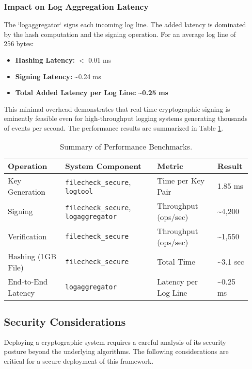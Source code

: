 \documentclass[12pt, letterpaper]{article}
\begin{document}
\subsubsection{Impact on Log Aggregation Latency}
The `logaggregator` signs each incoming log line. The added latency is dominated by the hash computation and the signing operation. For an average log line of 256 bytes:
\begin{itemize}
	\item \textbf{Hashing Latency:} $<$ 0.01 ms
	\item \textbf{Signing Latency:} \textasciitilde 0.24 ms
	\item \textbf{Total Added Latency per Log Line:} \textbf{\textasciitilde 0.25 ms}
\end{itemize}
This minimal overhead demonstrates that real-time cryptographic signing is eminently feasible even for high-throughput logging systems generating thousands of events per second. The performance results are summarized in Table \ref{tab:perf_summary}.

\begin{table}[h!]
	\centering
	\caption{Summary of Performance Benchmarks.}
	\label{tab:perf_summary}
	\begin{tabular}{|l|l|l|l|}
		\hline
		\textbf{Operation} & \textbf{System Component} & \textbf{Metric} & \textbf{Result} \\ \hline \hline
		Key Generation & \texttt{filecheck\_secure}, \texttt{logtool} & Time per Key Pair & 1.85 ms \\ \hline
		Signing & \texttt{filecheck\_secure}, \texttt{logaggregator} & Throughput (ops/sec) & \textasciitilde 4,200 \\ \hline
		Verification & \texttt{filecheck\_secure} & Throughput (ops/sec) & \textasciitilde 1,550 \\ \hline
		Hashing (1GB File) & \texttt{filecheck\_secure} & Total Time & \textasciitilde 3.1 sec \\ \hline
		End-to-End Latency & \texttt{logaggregator} & Latency per Log Line & \textasciitilde 0.25 ms \\ \hline
	\end{tabular}
\end{table}


\subsection{Security Considerations}
Deploying a cryptographic system requires a careful analysis of its security posture beyond the underlying algorithms. The following considerations are critical for a secure deployment of this framework.
\end{document}
